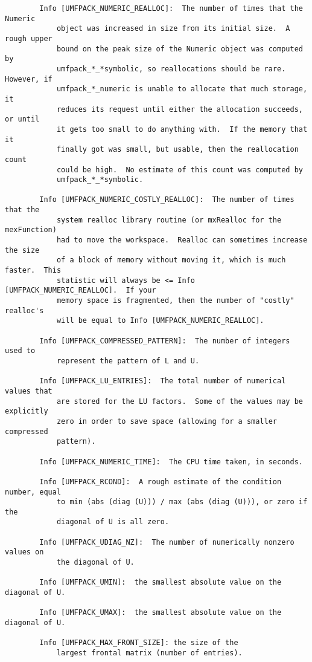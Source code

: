 \documentclass[11pt]{article}
\begin{document}
{\begin{verbatim}
        Info [UMFPACK_NUMERIC_REALLOC]:  The number of times that the Numeric
            object was increased in size from its initial size.  A rough upper
            bound on the peak size of the Numeric object was computed by
            umfpack_*_*symbolic, so reallocations should be rare.  However, if
            umfpack_*_numeric is unable to allocate that much storage, it
            reduces its request until either the allocation succeeds, or until
            it gets too small to do anything with.  If the memory that it
            finally got was small, but usable, then the reallocation count
            could be high.  No estimate of this count was computed by
            umfpack_*_*symbolic.

        Info [UMFPACK_NUMERIC_COSTLY_REALLOC]:  The number of times that the
            system realloc library routine (or mxRealloc for the mexFunction)
            had to move the workspace.  Realloc can sometimes increase the size
            of a block of memory without moving it, which is much faster.  This
            statistic will always be <= Info [UMFPACK_NUMERIC_REALLOC].  If your
            memory space is fragmented, then the number of "costly" realloc's
            will be equal to Info [UMFPACK_NUMERIC_REALLOC].

        Info [UMFPACK_COMPRESSED_PATTERN]:  The number of integers used to
            represent the pattern of L and U.

        Info [UMFPACK_LU_ENTRIES]:  The total number of numerical values that
            are stored for the LU factors.  Some of the values may be explicitly
            zero in order to save space (allowing for a smaller compressed
            pattern).

        Info [UMFPACK_NUMERIC_TIME]:  The CPU time taken, in seconds.

        Info [UMFPACK_RCOND]:  A rough estimate of the condition number, equal
            to min (abs (diag (U))) / max (abs (diag (U))), or zero if the
            diagonal of U is all zero.

        Info [UMFPACK_UDIAG_NZ]:  The number of numerically nonzero values on
            the diagonal of U.

        Info [UMFPACK_UMIN]:  the smallest absolute value on the diagonal of U.

        Info [UMFPACK_UMAX]:  the smallest absolute value on the diagonal of U.

        Info [UMFPACK_MAX_FRONT_SIZE]: the size of the
            largest frontal matrix (number of entries).


\end{verbatim}}
\end{document}
